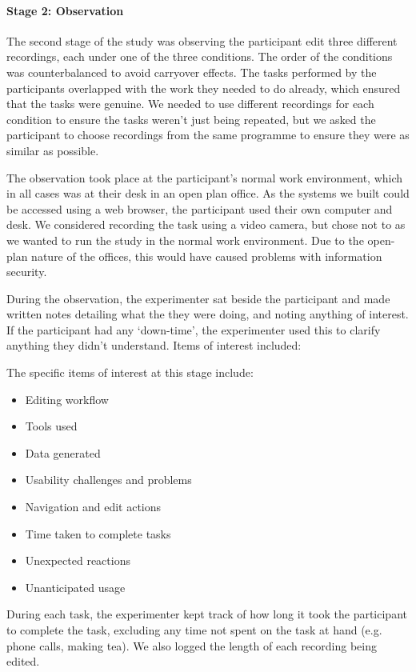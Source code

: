 \paragraph{Stage 2: Observation}

The second stage of the study was observing the participant edit three different recordings, each under one of the
three conditions.  The order of the conditions was counterbalanced to avoid carryover effects.  The tasks performed by
the participants overlapped with the work they needed to do already, which ensured that the tasks were genuine.  We
needed to use different recordings for each condition to ensure the tasks weren't just being repeated, but we asked the
participant to choose recordings from the same programme to ensure they were as similar as possible.

The observation took place at the participant's normal work environment, which in all cases was at their desk in an
open plan office. As the systems we built could be accessed using a web browser, the participant used their own
computer and desk. We considered recording the task using a video camera, but chose not to as we wanted to run the
study in the normal work environment. Due to the open-plan nature of the offices, this would have caused problems with
information security.

During the observation, the experimenter sat beside the participant and made written notes detailing what the
they were doing, and noting anything of interest. If the participant had any `down-time', the experimenter used this to
clarify anything they didn't understand. Items of interest included:

The specific items of interest at this stage include:
\begin{itemize}[noitemsep]
\item Editing workflow
\item Tools used
\item Data generated
\item Usability challenges and problems
\item Navigation and edit actions
\item Time taken to complete tasks
\item Unexpected reactions
\item Unanticipated usage
\end{itemize}

During each task, the experimenter kept track of how long it took the participant to complete the task, excluding any
time not spent on the task at hand (e.g. phone calls, making tea). We also logged the length of each recording being
edited.

